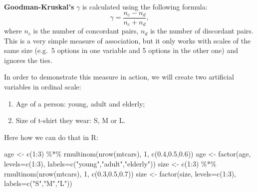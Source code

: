 \documentclass[
]{book}
\newenvironment{Shaded}{\begin{snugshade}}{\end{snugshade}}
\newcommand{\AttributeTok}[1]{\textcolor[rgb]{0.77,0.63,0.00}{#1}}
\newcommand{\DecValTok}[1]{\textcolor[rgb]{0.00,0.00,0.81}{#1}}
\newcommand{\FloatTok}[1]{\textcolor[rgb]{0.00,0.00,0.81}{#1}}
\newcommand{\FunctionTok}[1]{\textcolor[rgb]{0.00,0.00,0.00}{#1}}
\newcommand{\NormalTok}[1]{#1}
\newcommand{\OtherTok}[1]{\textcolor[rgb]{0.56,0.35,0.01}{#1}}
\newcommand{\SpecialCharTok}[1]{\textcolor[rgb]{0.00,0.00,0.00}{#1}}
\newcommand{\StringTok}[1]{\textcolor[rgb]{0.31,0.60,0.02}{#1}}
\providecommand{\tightlist}{%
  \setlength{\itemsep}{0pt}\setlength{\parskip}{0pt}}
\theoremstyle{definition}
\theoremstyle{definition}
\theoremstyle{definition}
\theoremstyle{definition}
\theoremstyle{remark}
\begin{document}
\textbf{Goodman-Kruskal's} \(\gamma\) is calculated using the following formula:
\begin{equation}
    \gamma = \frac{n_c - n_d}{n_c + n_d},
    \label{eq:measuresAssociationGoodman}
\end{equation}
where \(n_c\) is the number of concordant pairs, \(n_d\) is the number of discordant pairs. This is a very simple measure of association, but it only works with scales of the same size (e.g.~5 options in one variable and 5 options in the other one) and ignores the ties.

In order to demonstrate this measure in action, we will create two artificial variables in ordinal scale:

\begin{enumerate}
\def\labelenumi{\arabic{enumi}.}
\tightlist
\item
  Age of a person: young, adult and elderly;
\item
  Size of t-shirt they wear: S, M or L.
\end{enumerate}

Here how we can do that in R:

\begin{Shaded}
\begin{Highlighting}[]
\NormalTok{age }\OtherTok{\textless{}{-}} \FunctionTok{c}\NormalTok{(}\DecValTok{1}\SpecialCharTok{:}\DecValTok{3}\NormalTok{) }\SpecialCharTok{\%*\%} \FunctionTok{rmultinom}\NormalTok{(}\FunctionTok{nrow}\NormalTok{(mtcars), }\DecValTok{1}\NormalTok{,}
                               \FunctionTok{c}\NormalTok{(}\FloatTok{0.4}\NormalTok{,}\FloatTok{0.5}\NormalTok{,}\FloatTok{0.6}\NormalTok{))}
\NormalTok{age }\OtherTok{\textless{}{-}} \FunctionTok{factor}\NormalTok{(age, }\AttributeTok{levels=}\FunctionTok{c}\NormalTok{(}\DecValTok{1}\SpecialCharTok{:}\DecValTok{3}\NormalTok{),}
                 \AttributeTok{labels=}\FunctionTok{c}\NormalTok{(}\StringTok{"young"}\NormalTok{,}\StringTok{"adult"}\NormalTok{,}\StringTok{"elderly"}\NormalTok{))}
\NormalTok{size }\OtherTok{\textless{}{-}} \FunctionTok{c}\NormalTok{(}\DecValTok{1}\SpecialCharTok{:}\DecValTok{3}\NormalTok{) }\SpecialCharTok{\%*\%} \FunctionTok{rmultinom}\NormalTok{(}\FunctionTok{nrow}\NormalTok{(mtcars), }\DecValTok{1}\NormalTok{,}
                               \FunctionTok{c}\NormalTok{(}\FloatTok{0.3}\NormalTok{,}\FloatTok{0.5}\NormalTok{,}\FloatTok{0.7}\NormalTok{))}
\NormalTok{size }\OtherTok{\textless{}{-}} \FunctionTok{factor}\NormalTok{(size, }\AttributeTok{levels=}\FunctionTok{c}\NormalTok{(}\DecValTok{1}\SpecialCharTok{:}\DecValTok{3}\NormalTok{),}
                 \AttributeTok{labels=}\FunctionTok{c}\NormalTok{(}\StringTok{"S"}\NormalTok{,}\StringTok{"M"}\NormalTok{,}\StringTok{"L"}\NormalTok{))}
\end{Highlighting}
\end{Shaded}
\end{document}
